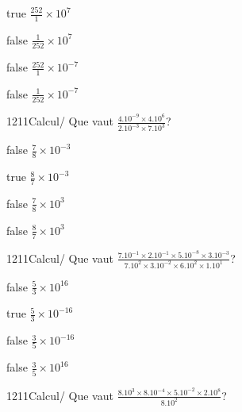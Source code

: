 \documentclass[11pt]{article}
\begin{document}
            \begin{reponses}
                \item[true] $\frac{252}{1}\times 10^{7}$
                \item[false] $\frac{1}{252}\times 10^{7}$
                \item[false] $\frac{252}{1}\times 10^{-7}$
                \item[false] $\frac{1}{252}\times 10^{-7}$
            \end{reponses}
            
            \begin{question}{1211}{Calcul}{}{/}
                Que vaut $\frac{4.10^{-9}\times 4.10^{6}}{2.10^{-3}\times 7.10^{3}}$?
            \end{question}
            
            \begin{reponses}
                \item[false] $\frac{7}{8}\times 10^{-3}$
                \item[true] $\frac{8}{7}\times 10^{-3}$
                \item[false] $\frac{7}{8}\times 10^{3}$
                \item[false] $\frac{8}{7}\times 10^{3}$
            \end{reponses}
            
            \begin{question}{1211}{Calcul}{}{/}
                Que vaut $\frac{7.10^{-1}\times 2.10^{-1}\times 5.10^{-8}\times 3.10^{-3}}{7.10^{2}\times 3.10^{-2}\times 6.10^{2}\times 1.10^{1}}$?
            \end{question}
            
            \begin{reponses}
                \item[false] $\frac{5}{3}\times 10^{16}$
                \item[true] $\frac{5}{3}\times 10^{-16}$
                \item[false] $\frac{3}{5}\times 10^{-16}$
                \item[false] $\frac{3}{5}\times 10^{16}$
            \end{reponses}
            
            \begin{question}{1211}{Calcul}{}{/}
                Que vaut $\frac{8.10^{3}\times 8.10^{-4}\times 5.10^{-2}\times 2.10^{8}}{8.10^{2}}$?
            \end{question}
            
\end{document}
